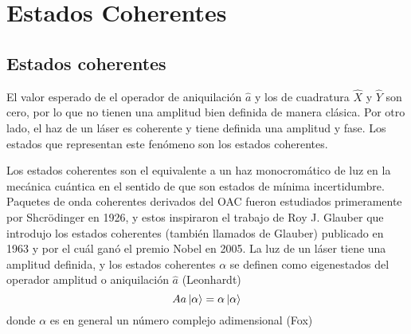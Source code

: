 \chapter{Estados Coherentes}
\section{Estados coherentes}

El valor esperado de el operador de aniquilación $\hat{a}$ y los de cuadratura $\hat{X}$ y $\hat{Y}$ son cero, por lo que no tienen una amplitud bien definida de manera clásica. Por otro lado, el haz de un láser es coherente y tiene definida una amplitud y fase. Los estados que representan este fenómeno son los estados coherentes.

Los estados coherentes son el equivalente a un haz monocromático de luz en la mecánica cuántica en el sentido de que son estados de mínima incertidumbre.  Paquetes de onda coherentes derivados del OAC fueron estudiados primeramente por Shcrödinger en 1926, y estos inspiraron el trabajo de Roy J. Glauber que introdujo los estados coherentes (también llamados de Glauber) publicado en 1963 y por el cuál ganó el premio Nobel en 2005. La luz de un láser tiene una amplitud definida, y los estados coherentes $\alpha$ se definen como eigenestados del operador amplitud o aniquilación $\hat{a}$ (Leonhardt)
\begin{equation*}
A{a} \ket{\alpha} = \alpha\ket{\alpha}
\end{equation*}
donde $\alpha$ es en general un número complejo adimensional (Fox)

